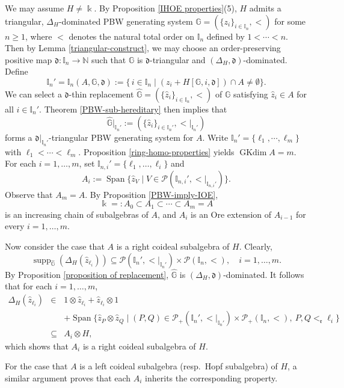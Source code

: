 \documentclass{article}
\makeatletter
\renewenvironment{proof}[1][\proofname]{\par
	\pushQED{\qed}%
	\normalfont \topsep6\p@\@plus6\p@\relax
	\trivlist
	\item[\hskip\labelsep
	\bfseries
	#1\@addpunct{.}]\ignorespaces
}{%
	\popQED\endtrivlist\@endpefalse
}
\theoremstyle{plain}
\theoremstyle{definition}
\numberwithin{equation}{section}
\DeclareMathOperator{\Span}{Span}
\DeclareMathOperator{\supp}{supp}
\DeclareMathOperator{\GKdim}{GKdim}
\newcommand{\PP}{\mathcal{P}}
\newcommand{\GG}{\mathbb{G}}
\newcommand{\II}{\mathbb{I}}
\newcommand{\dd}{\mathfrak{d}}
\newcommand{\rr}{\mathfrak{r}}
\makeatother
\begin{document}
	\begin{proof}
		We may assume $H\neq \Bbbk$. By Proposition \ref{IHOE properties}(5), $H$ admits a triangular, $\Delta_{H}$-dominated PBW generating system $\GG=(\{z_{i}\}_{i\in \II_{n}}, <)$ for some $n\geq 1$, where $<$ denotes the natural total order on $\II_{n}$ defined by $1<\cdots < n$. Then by Lemma \ref{triangular-construct}, we may choose an order-preserving positive map $\dd\colon\II_{n}\to\mathbb{N}$ such that $\GG$ is $\dd$-triangular and $(\Delta_{H},\dd)$-dominated. Define
		\[
		\II_{n}'=\II_{n}(A,\GG,\dd):=\{\, i\in\II_{n}\mid (z_{i}+H[\GG,i,\dd]) \cap A \neq \emptyset\}.
		\]
		We can select a $\dd$-thin replacement $\hat{\GG}=(\{\hat{z}_{i}\}_{i\in \II_{n}}, <)$ of $\GG$ satisfying $\hat{z}_{i} \in A$ for all $i\in \II_{n}'$. Theorem \ref{PBW-sub-hereditary} then implies that
		\[
		\hat{\GG}|_{\II_{n}'}:= (\{\hat{z}_{i}\}_{i\in \II_{n}'}, {<}|_{\II_{n}'})
		\]
		forms a $\dd|_{\II_{n}'}$-triangular PBW generating system for $A$. Write $\II_{n}'=\{\ell_{1}, \cdots , \ell_{m}\}$ with $\ell_{1}< \cdots < \ell_{m}$. Proposition \ref{ring-homo-properties} yields $\GKdim A =m$. For each $i=1,\ldots, m$, set $\II_{n,i}'= \{\ell_{1},\ldots, \ell_{i}\}$ and
		\[
		A_{i}:= \Span\{\hat{z}_{V} \mid V\in \PP(\II_{n,i}', {<}|_{\II_{n,i}'}) \}.
		\]
		Observe that $A_{m}=A$. By Proposition \ref{PBW-imply-IOE},
		\[
		\Bbbk=:A_{0}\subset A_{1} \subset \cdots \subset A_{m} =A
		\]
		is an increasing chain of subalgebras of $A$, and $A_{i}$ is an Ore extension of $A_{i-1}$ for every $i=1,\ldots, m$.
		
		Now consider the case that $A$ is a right coideal subalgebra of $H$. Clearly,
		\[
		\supp_{\hat{\GG}}(\Delta_{H}(\hat{z}_{\ell_{i}})) \subseteq \PP(\II_{n}', {<}|_{\II_{n}'})\times \PP(\II_{n}, <), \quad i=1,\ldots, m.
		\]
		By Proposition \ref{proposition of replacement}, $\hat{\GG}$ is $(\Delta_{H},\dd)$-dominated. It follows that for each $i=1,\ldots, m$,
		\begin{eqnarray*}
			\Delta_{H}(\hat{z}_{\ell_{i}}) &\in& 1\otimes \hat{z}_{\ell_{i}} + \hat{z}_{\ell_{i}}\otimes 1 \\
			&& + \Span\{\hat{z}_{P}\otimes \hat{z}_{Q} \mid (P,Q)\in \PP_{+}(\II_{n}', {<}|_{\II_{n}'})\times \PP_{+}(\II_{n}, <),\ P,Q <_{\rr} \ell_{i}  \} \\
			&\subseteq &A_{i}\otimes H,
		\end{eqnarray*}
		which shows that $A_{i}$ is a right coideal subalgebra of $H$.
		
		For the case that $A$ is a left coideal subalgebra (resp.\ Hopf subalgebra) of $H$, a similar argument proves that each $A_{i}$ inherits the corresponding property.
	\end{proof}
	
\end{document}
